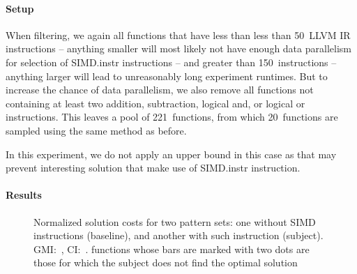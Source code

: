 \paragraph{Setup}

When filtering, we again all \glspl{function} that have less than less than
\num{50}~\gls{LLVM} \gls{IR} \glspl{instruction} -- anything smaller will most
likely not have enough data parallelism for selection of \gls{SIMD.instr}
\glspl{instruction} -- and greater than \num{150}~\glspl{instruction} --
anything larger will lead to unreasonably long experiment runtimes.
%
But to increase the chance of data parallelism, we also remove all
\glspl{function} not containing at least two addition, subtraction, logical and,
or logical or \glspl{instruction}.
%
This leaves a pool of \num{221}~\glspl{function}, from which
\num{20}~\glspl{function} are sampled using the same method as before.

In this experiment, we do not apply an upper bound in this case as that may
prevent interesting \gls{solution} that make use of \gls{SIMD.instr}
\gls{instruction}.



\paragraph{Results}



\begin{figure}
  \centering%
  \maxsizebox{\textwidth}{!}{%
    \trimBarchartPlot{%
    }%
  }

  \caption[Plot for evaluating the impact of SIMD instructions on code quality]%
          {%
            Normalized solution costs for two pattern sets: one without SIMD
            instructions (baseline), and another with such instruction
            (subject).
            GMI:~\printGMI{%
              \SimdVsWithoutCyclesSpeedupCyclesRegularSpeedupGmean%
            },
            CI:~\printGMICI{%
              \SimdVsWithoutCyclesSpeedupCyclesRegularSpeedupCiMin%
            }{%
              \SimdVsWithoutCyclesSpeedupCyclesRegularSpeedupCiMax%
            }.
            \Glspl{function} whose bars are marked with two dots are those
            for which the \gls{subject} does not find the optimal solution%
          }
\end{figure}


